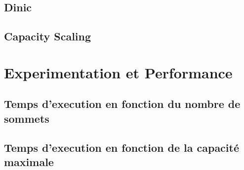 \documentclass[pdftex]{beamer}
\begin{document}

\subsection[Dinic]{Dinic}


\subsection[Cacity Scaling]{Capacity Scaling}

\section[Experimentation et Performance]{Experimentation et Performance}

\subsection[Temps d'execution en fonction du nombre de sommets]{Temps d'execution en fonction du nombre de sommets}



\subsection[Temps d'execution en fonction de la capacité maximale]{Temps d'execution en fonction de la capacité maximale}


\end{document}
